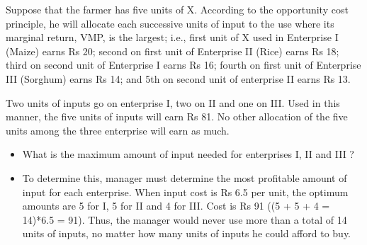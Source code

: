\documentclass[12pt,ignorenonframetext,aspectratio=169]{beamer}
\begin{document}
\begin{frame}{}
\protect\hypertarget{section-9}{}
\begin{table}[H]
\centering
{}
\end{table}
\end{frame}

\begin{frame}{}
\protect\hypertarget{section-10}{}
\footnotesize

Suppose that the farmer has five units of X. According to the
opportunity cost principle, he will allocate each successive units of
input to the use where its marginal return, VMP, is the largest; i.e.,
first unit of X used in Enterprise I (Maize) earns Rs 20; second on
first unit of Enterprise II (Rice) earns Rs 18; third on second unit of
Enterprise I earns Rs 16; fourth on first unit of Enterprise III
(Sorghum) earns Rs 14; and 5th on second unit of enterprise II earns Rs
13.

Two units of inputs go on enterprise I, two on II and one on III. Used
in this manner, the five units of inputs will earn Rs 81. No other
allocation of the five units among the three enterprise will earn as
much.
\end{frame}

\begin{frame}{}
\protect\hypertarget{section-11}{}
\begin{itemize}
\item
  What is the maximum amount of input needed for enterprises I, II and
  III ?
\item
  To determine this, manager must determine the most profitable amount
  of input for each enterprise. When input cost is Rs 6.5 per unit, the
  optimum amounts are 5 for I, 5 for II and 4 for III. Cost is Rs 91 ((5
  + 5 + 4 = 14)*6.5 = 91). Thus, the manager would never use more than a
  total of 14 units of inputs, no matter how many units of inputs he
  could afford to buy.
\end{itemize}
\end{frame}
\end{document}

